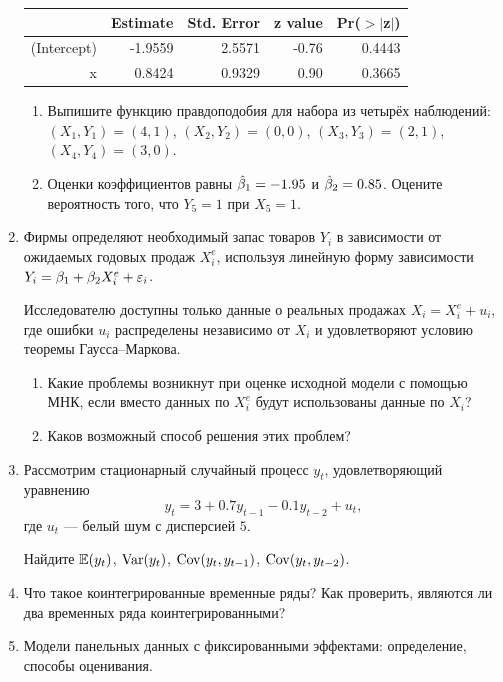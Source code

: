 \documentclass[12pt, a4paper]{article}
\begin{document}
\begin{enumerate}
\begin{tabular}{rrrrr}
  \hline
 & Estimate & Std. Error & z value & Pr($>$$|$z$|$) \\
  \hline
(Intercept) & -1.9559 & 2.5571 & -0.76 & 0.4443 \\
  x & 0.8424 & 0.9329 & 0.90 & 0.3665 \\
   \hline
\end{tabular}


\begin{enumerate}
\item Выпишите функцию правдоподобия для набора из четырёх наблюдений: $(X_1, Y_1) = (4, 1)$, $(X_2, Y_2) = (0, 0)$,  $(X_3, Y_3) = (2, 1)$,  $(X_4, Y_4) = (3, 0)$.
\item Оценки коэффициентов равны $\hat{\beta}_1 = -1.95$ и $\hat{\beta}_2 = 0.85$. Оцените вероятность того, что $Y_5 = 1$ при $X_5 = 1$.
\end{enumerate}


\item Фирмы определяют необходимый запас товаров $Y_i$ в зависимости от ожидаемых годовых продаж $X^e_i$, используя линейную форму зависимости $Y_i = \beta_1  + \beta_2 X^e_i + \varepsilon_i$.


Исследователю доступны только данные о реальных продажах $X_i = X^e_i + u_i$, где ошибки $u_i$ распределены независимо от $X_i$ и удовлетворяют условию теоремы Гаусса–Маркова.

\begin{enumerate}
\item Какие проблемы возникнут при оценке исходной модели с помощью МНК, если вместо данных по $X^e_i$ будут использованы данные по $X_i$?
\item Каков возможный способ решения этих проблем?
\end{enumerate}





\item Рассмотрим стационарный случайный процесс $y_t$, удовлетворяющий уравнению
\[
y_t = 3 + 0.7 y_{t-1} - 0.1 y_{t-2} + u_t,
\]
где $u_t$ — белый шум с дисперсией $5$.

Найдите $\mathbb{E}(y_t)$, $\operatorname{Var}(y_t)$, $\operatorname{Cov}(y_t, y_{t-1})$, $\operatorname{Cov}(y_t, y_{t-2})$.

\item Что такое коинтегрированные временные ряды? Как проверить, являются ли два временных ряда коинтегрированными?

\item Модели панельных данных с фиксированными эффектами: определение, способы оценивания.

\end{enumerate}
\end{document}
